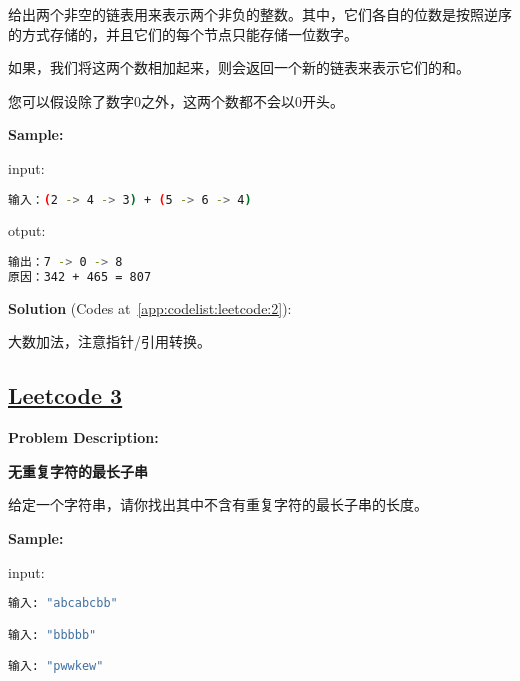 给出两个非空的链表用来表示两个非负的整数。其中，它们各自的位数是按照逆序的方式存储的，并且它们的每个节点只能存储一位数字。\par

如果，我们将这两个数相加起来，则会返回一个新的链表来表示它们的和。\par

您可以假设除了数字0之外，这两个数都不会以0开头。\par


\textbf{Sample:}\par

input:\par

\begin{lstlisting}[language=bash]
输入：(2 -> 4 -> 3) + (5 -> 6 -> 4)
\end{lstlisting}

otput:\par

\begin{lstlisting}[language=bash]
输出：7 -> 0 -> 8
原因：342 + 465 = 807
\end{lstlisting}

\textbf{Solution }(Codes at~\ref{app:codelist:leetcode:2}):\par

大数加法，注意指针/引用转换。\par



\subsection{\href{https://leetcode-cn.com/}{Leetcode 3}}\label{app:problemlist:leetcode:3}

\textbf{Problem Description:}\par

\textbf{无重复字符的最长子串}\par

给定一个字符串，请你找出其中不含有重复字符的最长子串的长度。\par


\textbf{Sample:}\par

input:\par

\begin{lstlisting}[language=bash]
输入: "abcabcbb"

输入: "bbbbb"

输入: "pwwkew"
\end{lstlisting}

